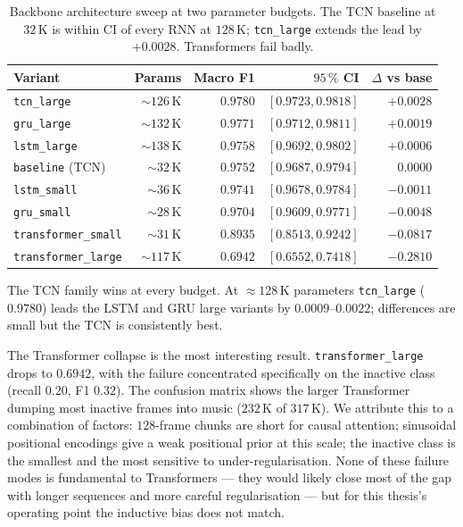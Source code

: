 \begin{table}[h]
\centering
\begin{tabular}{lrrrr}
\toprule
\textbf{Variant} & \textbf{Params} & \textbf{Macro F1} & \textbf{$95\,\%$ CI} & \textbf{$\Delta$ vs base} \\
\midrule
\texttt{tcn\_large}        & $\sim 126$\,K & $\mathbf{0.9780}$ & $[0.9723, 0.9818]$ & $+0.0028$ \\
\texttt{gru\_large}        & $\sim 132$\,K & $0.9771$          & $[0.9712, 0.9811]$ & $+0.0019$ \\
\texttt{lstm\_large}       & $\sim 138$\,K & $0.9758$          & $[0.9692, 0.9802]$ & $+0.0006$ \\
\texttt{baseline} (TCN)    & $\sim  32$\,K & $0.9752$          & $[0.9687, 0.9794]$ & $\phantom{+}0.0000$ \\
\texttt{lstm\_small}       & $\sim  36$\,K & $0.9741$          & $[0.9678, 0.9784]$ & $-0.0011$ \\
\texttt{gru\_small}        & $\sim  28$\,K & $0.9704$          & $[0.9609, 0.9771]$ & $-0.0048$ \\
\texttt{transformer\_small} & $\sim  31$\,K & $0.8935$         & $[0.8513, 0.9242]$ & $-0.0817$ \\
\texttt{transformer\_large} & $\sim 117$\,K & $0.6942$         & $[0.6552, 0.7418]$ & $-0.2810$ \\
\bottomrule
\end{tabular}
\caption{Backbone architecture sweep at two parameter budgets. The TCN baseline at $32$\,K is within CI of every RNN at $128$\,K; \texttt{tcn\_large} extends the lead by $+0.0028$. Transformers fail badly.}
\label{tab:architecture_results}
\end{table}

The TCN family wins at every budget.
At $\approx 128$\,K parameters \texttt{tcn\_large} ($0.9780$) leads the LSTM and GRU large variants by $0.0009$--$0.0022$; differences are small but the TCN is consistently best.

The Transformer collapse is the most interesting result.
\texttt{transformer\_large} drops to $0.6942$, with the failure concentrated specifically on the inactive class (recall $0.20$, F1 $0.32$).
The confusion matrix shows the larger Transformer dumping most inactive frames into music ($232$\,K of $317$\,K).
We attribute this to a combination of factors: $128$-frame chunks are short for causal attention; sinusoidal positional encodings give a weak positional prior at this scale; the inactive class is the smallest and the most sensitive to under-regularisation.
None of these failure modes is fundamental to Transformers — they would likely close most of the gap with longer sequences and more careful regularisation — but for this thesis's operating point the inductive bias does not match.

